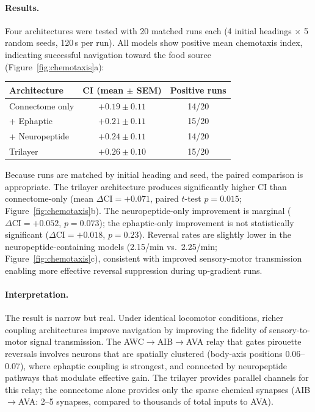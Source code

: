 \documentclass[12pt]{article}
\begin{document}
\paragraph{Results.} Four architectures were tested with 20 matched runs each (4 initial headings $\times$ 5 random seeds, 120\,s per run). All models show positive mean chemotaxis index, indicating successful navigation toward the food source (Figure~\ref{fig:chemotaxis}a):

\begin{center}
\begin{tabular}{l c c}
\toprule
\textbf{Architecture} & \textbf{CI (mean $\pm$ SEM)} & \textbf{Positive runs} \\
\midrule
Connectome only & $+0.19 \pm 0.11$ & 14/20 \\
+ Ephaptic & $+0.21 \pm 0.11$ & 15/20 \\
+ Neuropeptide & $+0.24 \pm 0.11$ & 14/20 \\
Trilayer & $+0.26 \pm 0.10$ & 15/20 \\
\bottomrule
\end{tabular}
\end{center}

Because runs are matched by initial heading and seed, the paired comparison is appropriate. The trilayer architecture produces significantly higher CI than connectome-only (mean $\Delta\text{CI} = +0.071$, paired $t$-test $p = 0.015$; Figure~\ref{fig:chemotaxis}b). The neuropeptide-only improvement is marginal ($\Delta\text{CI} = +0.052$, $p = 0.073$); the ephaptic-only improvement is not statistically significant ($\Delta\text{CI} = +0.018$, $p = 0.23$). Reversal rates are slightly lower in the neuropeptide-containing models (2.15/min vs.\ 2.25/min; Figure~\ref{fig:chemotaxis}c), consistent with improved sensory-motor transmission enabling more effective reversal suppression during up-gradient runs.

\paragraph{Interpretation.} The result is narrow but real. Under identical locomotor conditions, richer coupling architectures improve navigation by improving the fidelity of sensory-to-motor signal transmission. The AWC$\to$AIB$\to$AVA relay that gates pirouette reversals involves neurons that are spatially clustered (body-axis positions $0.06$--$0.07$), where ephaptic coupling is strongest, and connected by neuropeptide pathways that modulate effective gain. The trilayer provides parallel channels for this relay; the connectome alone provides only the sparse chemical synapses (AIB$\to$AVA: 2--5 synapses, compared to thousands of total inputs to AVA).
\end{document}
